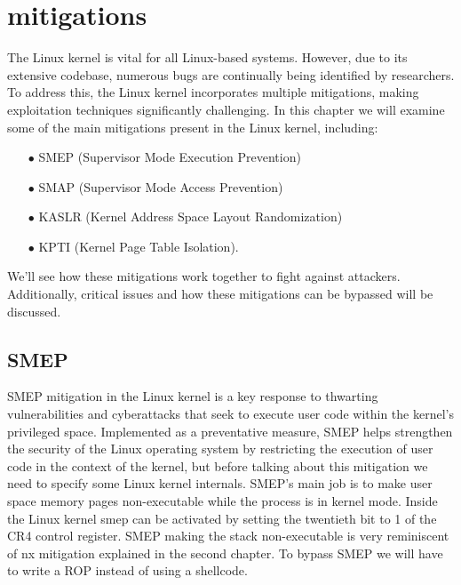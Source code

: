 \documentclass{report}
\begin{document}
    \section{mitigations}
    The Linux kernel is vital for all Linux-based systems. However, due to its extensive codebase, numerous bugs are continually being identified by researchers. To address this, the Linux kernel incorporates multiple mitigations, making exploitation techniques significantly challenging.\newline
    In this chapter we will examine some of the main mitigations present in the Linux kernel, including:
    \begin{itemize}
        \item[$\bullet$] SMEP (Supervisor Mode Execution Prevention)
        \item[$\bullet$] SMAP (Supervisor Mode Access Prevention) 
        \item[$\bullet$] KASLR (Kernel Address Space Layout Randomization)   
        \item[$\bullet$] KPTI (Kernel Page Table Isolation).\newline 
    \end{itemize}
    We'll see how these mitigations work together to fight against attackers.\newline
    Additionally, critical issues and how these mitigations can be bypassed will be discussed.\newline
    \subsection{SMEP}
    SMEP mitigation in the Linux kernel is a key response to thwarting vulnerabilities and cyberattacks that seek to execute user code within the kernel's privileged space. Implemented as a preventative measure, SMEP helps strengthen the security of the Linux operating system by restricting the execution of user code in the context of the kernel, but before talking about this mitigation we need to specify some Linux kernel internals.\newline
    SMEP's main job is to make user space memory pages non-executable while the process is in kernel mode. Inside the Linux kernel smep can be activated by setting the twentieth bit to 1 of the CR4 control register.\newline
    SMEP making the stack non-executable is very reminiscent of nx mitigation explained in the second chapter.\newline
    To bypass SMEP we will have to write a ROP instead of using a shellcode.\newline
\end{document}
